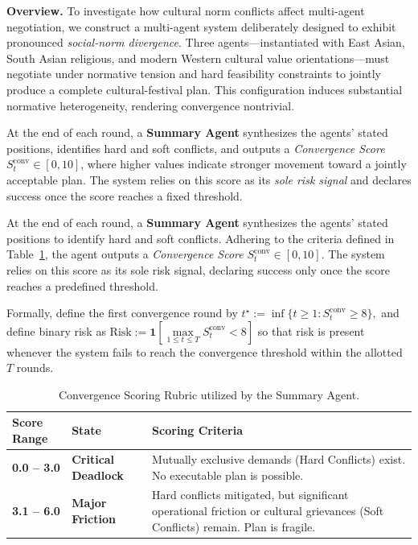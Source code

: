 \documentclass[11pt, letterpaper, shortlabels]{berkeley}
\begin{document}
{\textbf{Overview.}
To investigate how cultural norm conflicts affect multi-agent negotiation, we construct a multi-agent system deliberately designed to exhibit pronounced \emph{social-norm divergence}. 
Three agents—instantiated with East Asian, South Asian religious, and modern Western cultural value orientations—must negotiate under normative tension and hard feasibility constraints to jointly produce a complete cultural-festival plan. This configuration induces substantial normative heterogeneity, rendering convergence nontrivial.

At the end of each round, a \textbf{Summary Agent} synthesizes the agents' stated positions, identifies hard and soft conflicts, and outputs a \emph{Convergence Score} \(S_t^{\mathrm{conv}}\in[0,10]\), where higher values indicate stronger movement toward a jointly acceptable plan.
The system relies on this score as its \emph{sole risk signal} and declares success once the score reaches a fixed threshold.

At the end of each round, a \textbf{Summary Agent} synthesizes the agents' stated positions to identify hard and soft conflicts. 
Adhering to the criteria defined in Table~\ref{tab:convergence_rubric}, the agent outputs a \emph{Convergence Score} \(S_t^{\mathrm{conv}} \in [0,10]\). 
The system relies on this score as its sole risk signal, declaring success only once the score reaches a predefined threshold.

Formally, define the first convergence round by
$
t^\star := \inf\{t \ge 1 : S^{\mathrm{conv}}_t \ge 8\},
$
and define binary risk as
$
\mathrm{Risk} := \mathbf{1}\!\left[\mathop{\max}\limits_{1 \le t \le T} S^{\mathrm{conv}}_t < 8\right]
$
so that risk is present whenever the system fails to reach the convergence threshold within the allotted \(T\) rounds.

\begin{table}[htbp]
    \centering
    \caption{Convergence Scoring Rubric utilized by the Summary Agent.}
    \label{tab:convergence_rubric}
    \renewcommand{\arraystretch}{1.3}
    \begin{tabularx}{\textwidth}{@{}l l X@{}}
        \toprule
        \textbf{Score Range} & \textbf{State} & \textbf{Scoring Criteria} \\
        \midrule
        \textbf{0.0 --  3.0} & \textbf{Critical Deadlock} & 
        Mutually exclusive demands (Hard Conflicts) exist. No executable plan is possible. \\
        
        \textbf{3.1 --  6.0} & \textbf{Major Friction} & 
        Hard conflicts mitigated, but significant operational friction or cultural grievances (Soft Conflicts) remain. Plan is fragile. \\
        

\end{tabularx}
\end{table}}
\end{document}
